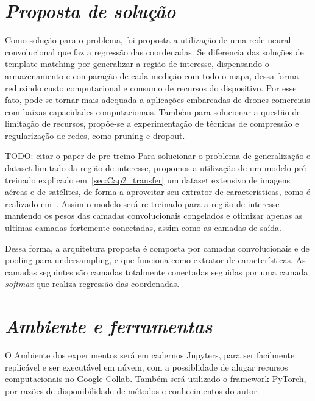 \section{\textit{Proposta de solução}}\label{sec:Cap3_Proposta}

Como solução para o problema, foi proposta a utilização de uma rede neural convolucional que faz a regressão das coordenadas. Se diferencia das soluções de template matching por generalizar a região de interesse, dispensando o armazenamento e comparação de cada medição com todo o mapa, dessa forma reduzindo custo computacional e consumo de recursos do dispositivo. Por esse fato, pode se tornar mais adequada a aplicações embarcadas de drones comerciais com baixas capacidades computacionais. Também para solucionar a questão de limitação de recursos, propõe-se a experimentação de técnicas de compressão e regularização de redes, como pruning e dropout.

TODO: citar o paper de pre-treino
Para solucionar o problema de generalização e dataset limitado da região de interesse, propomos a utilização de um modelo pré-treinado explicado em~\ref{sec:Cap2_transfer} um dataset extensivo de imagens aéreas e de satélites, de forma a aproveitar seu extrator de características, como é realizado em~\cite{Shiguemori2016Embedded}. Assim o modelo será re-treinado para a região de interesse mantendo os pesos das camadas convolucionais congelados e otimizar apenas as ultimas camadas fortemente conectadas, assim como as camadas de saída. 

Dessa forma, a arquitetura proposta é composta por camadas convolucionais e de pooling para undersampling, e que funciona como extrator de características. As camadas seguintes são camadas totalmente conectadas seguidas por uma camada \textit{softmax} que realiza regressão das coordenadas.

\section{\textit{Ambiente e ferramentas}}\label{sec:Cap3_Ferramentas}
O Ambiente dos experimentos será em cadernos Jupyters, para ser facilmente replicável e ser executável em núvem, com a possiblidade de alugar recursos computacionais no Google Collab. Também será utilizado o framework PyTorch, por razões de disponibilidade de métodos e conhecimentos do autor.


